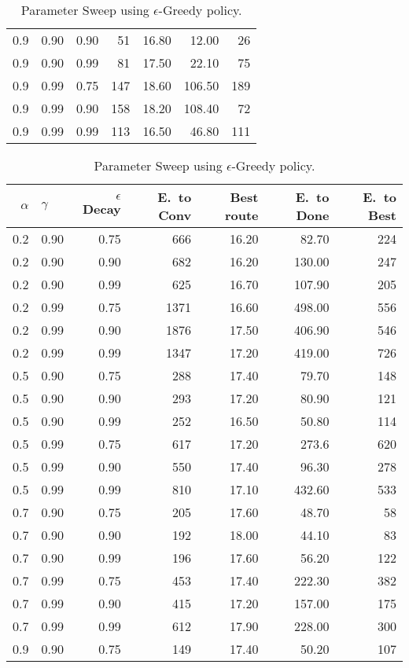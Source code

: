 \begin{table}[h]
\begin{tabular}{r l r | r r r r}
		0.9 & 0.90  & 0.90 & 51  & 16.80 & 12.00  & 26 \\
		0.9 & 0.90  & 0.99 & 81  & 17.50 & 22.10  & 75 \\
		0.9 & 0.99  & 0.75 & 147 & 18.60 & 106.50 & 189 \\
		0.9 & 0.99  & 0.90 & 158 & 18.20 & 108.40 & 72 \\
		0.9 & 0.99  & 0.99 & 113 & 16.50 & 46.80  & 111 \\
		\bottomrule
	\end{tabular}
	\caption{Parameter Sweep using $\epsilon$-Greedy policy.}
	\vspace{3em}
	\begin{tabular}{r l r | r r r r}
		$\alpha$ & $\gamma$ & $\epsilon$ Decay &
		E.\ to Conv & Best route & E.\ to Done & E.\ to Best\footnotemark[0]{} \\
		\midrule
			0.2 & 0.90 & 0.75 & 666  & 16.20 &  82.70 &  224 \\
			0.2 & 0.90 & 0.90 & 682  & 16.20 & 130.00 &  247 \\
			0.2 & 0.90 & 0.99 & 625  & 16.70 & 107.90 &  205 \\
			0.2 & 0.99 & 0.75 & 1371 & 16.60 & 498.00 &  556 \\
			0.2 & 0.99 & 0.90 & 1876 & 17.50 & 406.90 &  546 \\
			0.2 & 0.99 & 0.99 & 1347 & 17.20 & 419.00 &  726 \\
			0.5 & 0.90 & 0.75 & 288  & 17.40 &  79.70 &  148 \\
			0.5 & 0.90 & 0.90 & 293  & 17.20 &  80.90 &  121 \\
			0.5 & 0.90 & 0.99 & 252  & 16.50 &  50.80 &  114 \\
			0.5 & 0.99 & 0.75 & 617  & 17.20 &  273.6 &  620 \\
			0.5 & 0.99 & 0.90 & 550  & 17.40 &  96.30 &  278 \\
			0.5 & 0.99 & 0.99 & 810  & 17.10 & 432.60 &  533 \\
			0.7 & 0.90 & 0.75 & 205  & 17.60 &  48.70 &   58 \\
			0.7 & 0.90 & 0.90 & 192  & 18.00 &  44.10 &   83 \\
			0.7 & 0.90 & 0.99 & 196  & 17.60 &  56.20 &  122 \\
			0.7 & 0.99 & 0.75 & 453  & 17.40 & 222.30 &  382 \\
			0.7 & 0.99 & 0.90 & 415  & 17.20 & 157.00 &  175 \\
			0.7 & 0.99 & 0.99 & 612  & 17.90 & 228.00 &  300 \\
			0.9 & 0.90 & 0.75 & 149  & 17.40 &  50.20 &  107 \\

\end{tabular}
\end{table}
